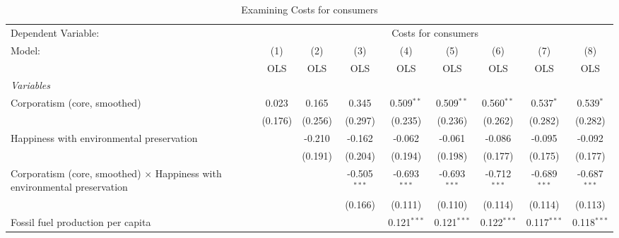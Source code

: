 
\begin{table}[htbp]
   \caption{Examining Costs for consumers}
   \centering
   \begin{tabular}{lcccccccc}
      \toprule
      Dependent Variable: & \multicolumn{8}{c}{Costs for consumers}\\
      Model:                                                                           & (1)     & (2)     & (3)            & (4)            & (5)            & (6)            & (7)            & (8)\\  
                                                                                       &  OLS    & OLS     & OLS            & OLS            & OLS            & OLS            & OLS            & OLS\\  
      \midrule
      \emph{Variables}\\
      Corporatism (core, smoothed)                                                     & 0.023   & 0.165   & 0.345          & 0.509$^{**}$   & 0.509$^{**}$   & 0.560$^{**}$   & 0.537$^{*}$    & 0.539$^{*}$\\   
                                                                                       & (0.176) & (0.256) & (0.297)        & (0.235)        & (0.236)        & (0.262)        & (0.282)        & (0.282)\\   
      Happiness with environmental preservation                                        &         & -0.210  & -0.162         & -0.062         & -0.061         & -0.086         & -0.095         & -0.092\\   
                                                                                       &         & (0.191) & (0.204)        & (0.194)        & (0.198)        & (0.177)        & (0.175)        & (0.177)\\   
      Corporatism (core, smoothed) $\times$ Happiness with environmental preservation  &         &         & -0.505$^{***}$ & -0.693$^{***}$ & -0.693$^{***}$ & -0.712$^{***}$ & -0.689$^{***}$ & -0.687$^{***}$\\   
                                                                                       &         &         & (0.166)        & (0.111)        & (0.110)        & (0.114)        & (0.114)        & (0.113)\\   
      Fossil fuel production per capita                                                &         &         &                & 0.121$^{***}$  & 0.121$^{***}$  & 0.122$^{***}$  & 0.117$^{***}$  & 0.118$^{***}$\\   

\end{tabular}
\end{table}
